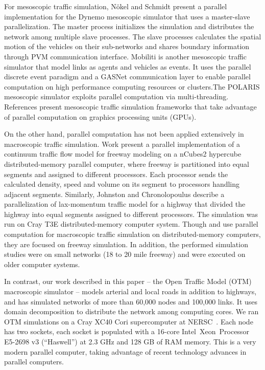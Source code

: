 For mesoscopic traffic simulation, N{\"o}kel and Schmidt present a parallel implementation for the Dynemo mesoscopic simulator that uses a master-slave parallelization. The master process initializes the simulation and distributes the network among multiple slave processes. The slave processes calculates the spatial motion of the vehicles on their sub-networks and shares boundary information through PVM communication interface. Mobiliti \cite{chan2018mobiliti} is another mesoscopic traffic simulator that model links as agents and vehicles as events. It uses the parallel discrete event paradigm and a GASNet communication layer to enable parallel computation on high performance computing resources or clusters.The POLARIS mesoscopic simulator \cite{auld2016polaris} exploits parallel computation via multi-threading. References  \cite{xu2014mesoscopic,song2017supporting,strippgen2009multi} present mesoscopic traffic simulation frameworks that take advantage of parallel computation on graphics processing units (GPUs). 

On the other hand, parallel computation has not been applied extensively in macroscopic traffic simulation. Work \cite{chronopoulos1998real} present a parallel implementation of a continuum traffic flow model for freeway modeling on a nCubes2 hypercube distributed-memory parallel computer, where freeway is partitioned into equal segments and assigned to different processors. Each processor sends the calculated density, speed and volume on its segment to processors handling adjacent segments. Similarly, Johnston and Chronolopoulus \cite{johnston1999parallelization} describe a parallelization of lax-momentum traffic model for a highway that divided the highway into equal segments assigned to different processors. The simulation was run on Cray T3E 
distributed-memory computer system. Though \cite{chronopoulos1998real} and \cite{johnston1999parallelization} use parallel computation for macroscopic traffic simulation on distributed-memory computers, they are focused on freeway simulation. In addition, the performed simulation studies were on small networks (18 to 20 mile freeway) and were executed on older computer systems.

In contrast, our work described in this paper -- the Open Traffic Model (OTM)
macroscopic simulator -- models arterial and local roads in addition to highways,
and has simulated networks of more than 60,000 nodes and 100,000 links.
It uses domain decomposition to distribute the network among computing cores. We ran OTM simulations on a Cray XC40 Cori supercomputer
at NERSC~\cite{Cori}. Each node has two sockets, each socket is
populated with a 16-core Intel\textcopyright~Xeon\texttrademark~Processor
E5-2698 v3 (``Haswell'') at 2.3 GHz and 128 GB of RAM memory.
This is a very modern parallel computer, taking advantage of recent
technology advances in parallel computers. 
